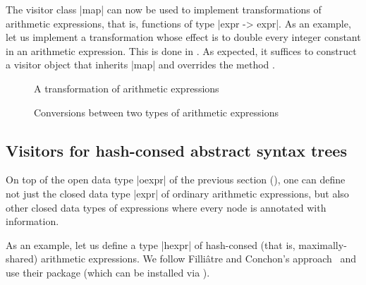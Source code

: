 \documentclass[11pt,a4paper,twoside]{article}
\begin{document}
The visitor class \oc|map| can now be used to implement transformations of
arithmetic expressions, that is, functions of type \oc|expr -> expr|. As an
example, let us implement a transformation whose effect is to double every
integer constant in an arithmetic expression. This is done in
. As expected, it suffices to construct a visitor
object that inherits \oc|map| and overrides the method
.


\begin{figure}[p]
\caption{A transformation of arithmetic expressions}
\label{fig:expr13double}
\end{figure}

\begin{figure}[p]
\caption{Conversions between two types of arithmetic expressions}
\label{fig:expr14}
\end{figure}

\subsection{Visitors for hash-consed abstract syntax trees}
\label{sec:advanced:hashconsed}

On top of the open data type \oc|oexpr| of the previous section
(), one can define not just the closed data type
\oc|expr| of ordinary arithmetic expressions, but also other closed data types
of expressions where every node is annotated with information.

As an example, let us define a type \oc|hexpr| of hash-consed (that is,
maximally-shared) arithmetic expressions. We follow Filliâtre and Conchon's
approach~\cite{filliatre-conchon-06} and use their package \hashcons (which
can be installed via \opam).






\end{document}
